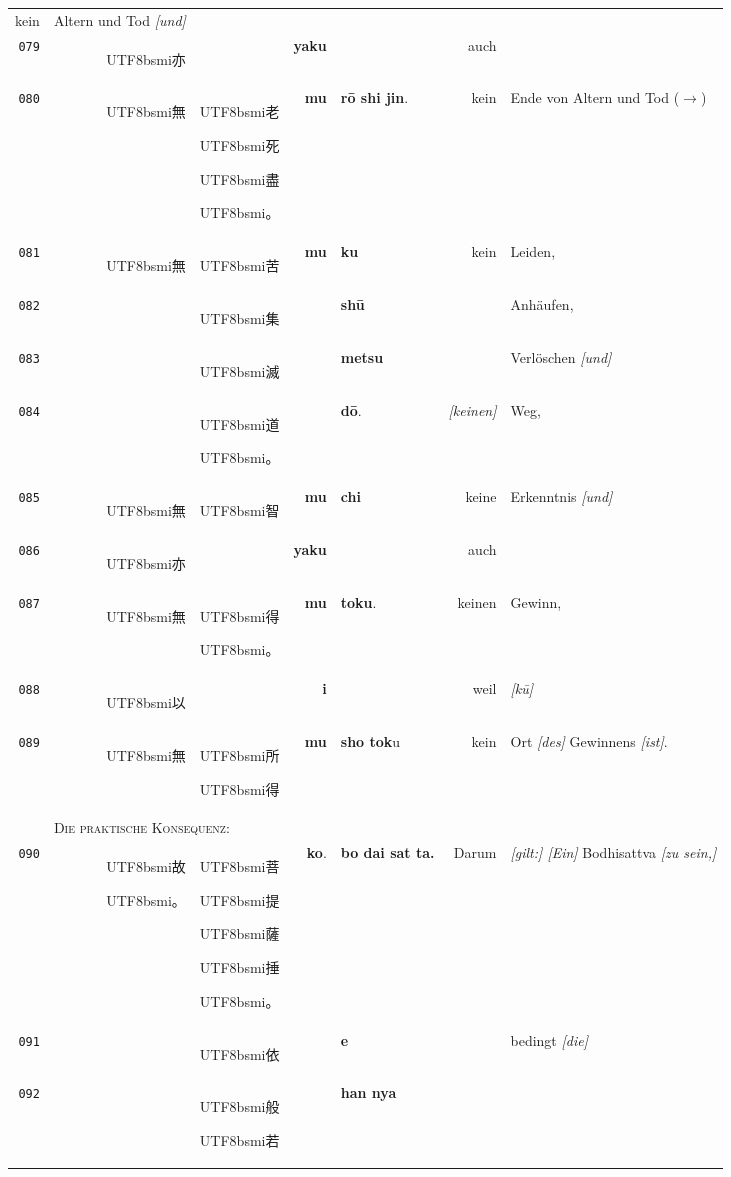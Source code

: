 \documentclass[
DIV=calc,
BCOR=5mm,
11pt,
headings=small,
oneside,
bibtotocnumbered,
english,ngerman]{scrartcl}
\newcommand{\cnbsmi}[1]{\begin{CJK}{UTF8}{bsmi}#1\end{CJK}}
\begin{document}
\begin{center}
\begin{tabular}{r|rl|rl|rl}
  \textrm{kein} & \textrm{Altern und Tod \emph{[und]}} \\
{\tiny\texttt{079}}&
  \cnbsmi{亦} & ~ &
  \textbf{yaku} & ~ &
  \textrm{auch} & ~ \\
{\tiny\texttt{080}}&
  \cnbsmi{無} & \cnbsmi{老} \cnbsmi{死} \cnbsmi{盡} \cnbsmi{。} &
  \textbf{mu} &
  \textbf{rō shi jin}. &
  \textrm{kein} & \textrm{Ende von Altern und Tod {\tiny ($\rightarrow$)}}\\
\hline
{\tiny\texttt{081}}&
  \cnbsmi{無} & \cnbsmi{苦} & 
  \textbf{mu} & \textbf{ku} &
  \textrm{kein} & \textrm{Leiden,} \\  
{\tiny\texttt{082}}&
  ~ & \cnbsmi{集} &
  ~ & \textbf{shū} & 
  ~ & \textrm{Anhäufen,} \\  
{\tiny\texttt{083}}&
  ~ & \cnbsmi{滅} &
  ~ & \textbf{metsu} & 
  ~ & \textrm{Verlöschen \emph{[und]}} \\  
{\tiny\texttt{084}}&
  ~ & \cnbsmi{道} \cnbsmi{。} & 
  ~ & \textbf{dō}. &
  \textrm{\emph{[keinen]}} & \textrm{Weg,} \\
\hdashline 
{\tiny\texttt{085}}&
  \cnbsmi{無} & \cnbsmi{智} &
  \textbf{mu} & \textbf{chi} &
  \textrm{keine} & \textrm{Erkenntnis \emph{[und]}} \\  
{\tiny\texttt{086}}&
  \cnbsmi{亦} & ~ &
  \textbf{yaku} & ~ &
  \textrm{auch} & ~ \\
{\tiny\texttt{087}}&
  \cnbsmi{無} & \cnbsmi{得} \cnbsmi{。} &
  \textbf{mu} & \textbf{toku}. &
  \textrm{keinen} & \textrm{Gewinn}, \\  
{\tiny\texttt{088}}&
  \cnbsmi{以} & ~ &
  \textbf{i} & ~ &
  \textrm{weil} &  \textrm{\emph{[kū]}} \\  
{\tiny\texttt{089}}&
  \cnbsmi{無} & \cnbsmi{所} \cnbsmi{得}  &
  \textbf{mu} & \textbf{sho tok}\tiny{u}  &
  \textrm{kein} & \textrm{Ort \emph{[des]} Gewinnens \emph{[ist]}.} \\
\hline
  ~ & \multicolumn{6}{l}{\textsc{Die praktische Konsequenz:}}\\
\hline
{\tiny\texttt{090}}&
  \cnbsmi{故}\cnbsmi{。} & 
    \cnbsmi{菩} \cnbsmi{提} \cnbsmi{薩} \cnbsmi{捶}\cnbsmi{。}  &
  \textbf{ko}. & \textbf{bo dai sat ta.} &
  \textrm{Darum} & 
    \textrm{\emph{[gilt:] [Ein]} Bodhisattva \emph{[zu sein,]}}\\
{\tiny\texttt{091}}&
  ~ & \cnbsmi{依} &
  ~ & \textbf{e} & 
  ~ & \textrm{bedingt \emph{[die]}} \\
\newline
{\tiny\texttt{092}}&
  ~ & \cnbsmi{般} \cnbsmi{若}  &
  ~ & \textbf{han nya} &

\end{tabular}
\end{center}
\end{document}
